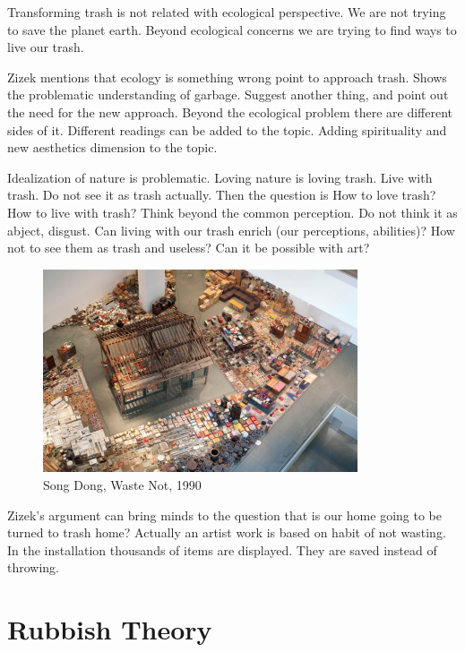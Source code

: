 Transforming trash is not related with ecological perspective. We are not trying to save the planet earth. Beyond ecological concerns we are trying to find ways to live our trash. 

Zizek mentions that ecology is something wrong point to approach trash. Shows the problematic understanding of garbage. Suggest another thing, and point out the need for the new approach. Beyond the ecological problem there are different sides of it. Different readings can be added to the topic. Adding spirituality and new aesthetics dimension to the topic. 

Idealization of nature is problematic. Loving nature is loving trash. Live with trash. Do not see it as trash actually. Then the question is How to love trash? How to live with trash? Think beyond the common perception. Do not think it as abject, disgust. Can living with our trash enrich (our perceptions, abilities)? How not to see them as trash and useless? Can it be possible with art?

\begin{figure}[h!]
  \centering
  \includegraphics[height=6cm]{graphics/SongDong_WasteNot.jpg}
  \caption{Song Dong, Waste Not, 1990}
  \label{fig:SongDong_WasteNot}
\end{figure}

Zizek's argument can bring minds to the question that is our home going to be turned to trash home? Actually an artist work is based on habit of not wasting. In the installation thousands of items are displayed. They are saved instead of throwing. 





%
%
\section{Rubbish Theory}


